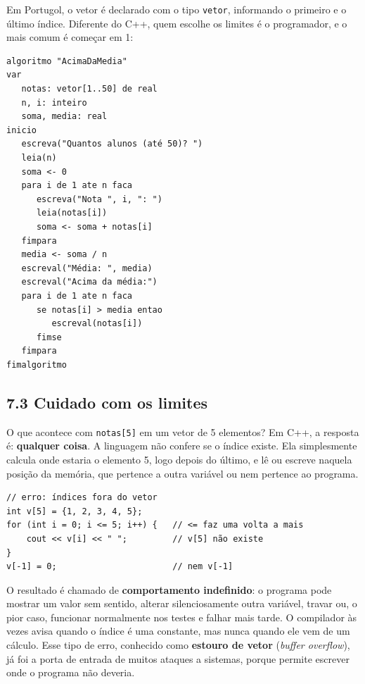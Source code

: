 Em Portugol, o vetor é declarado com o tipo \texttt{vetor}, informando o primeiro e o último índice. Diferente do C++, quem escolhe os limites é o programador, e o mais comum é começar em 1:

\begin{codigo}
\begin{Verbatim}[breaklines=true, breaksymbolleft={}, fontsize=\footnotesize]
algoritmo "AcimaDaMedia"
var
   notas: vetor[1..50] de real
   n, i: inteiro
   soma, media: real
inicio
   escreva("Quantos alunos (até 50)? ")
   leia(n)
   soma <- 0
   para i de 1 ate n faca
      escreva("Nota ", i, ": ")
      leia(notas[i])
      soma <- soma + notas[i]
   fimpara
   media <- soma / n
   escreval("Média: ", media)
   escreval("Acima da média:")
   para i de 1 ate n faca
      se notas[i] > media entao
         escreval(notas[i])
      fimse
   fimpara
fimalgoritmo
\end{Verbatim}
\end{codigo}

\subsection{7.3 Cuidado com os limites}

O que acontece com \texttt{notas[5]} em um vetor de 5 elementos? Em C++, a resposta é: \textbf{qualquer coisa}. A linguagem não confere se o índice existe. Ela simplesmente calcula onde estaria o elemento 5, logo depois do último, e lê ou escreve naquela posição da memória, que pertence a outra variável ou nem pertence ao programa.

\begin{codigo}
\begin{Verbatim}[breaklines=true, breaksymbolleft={}, fontsize=\footnotesize]
// erro: índices fora do vetor
int v[5] = {1, 2, 3, 4, 5};
for (int i = 0; i <= 5; i++) {   // <= faz uma volta a mais
    cout << v[i] << " ";         // v[5] não existe
}
v[-1] = 0;                       // nem v[-1]
\end{Verbatim}
\end{codigo}

O resultado é chamado de \textbf{comportamento indefinido}: o programa pode mostrar um valor sem sentido, alterar silenciosamente outra variável, travar ou, o pior caso, funcionar normalmente nos testes e falhar mais tarde. O compilador às vezes avisa quando o índice é uma constante, mas nunca quando ele vem de um cálculo. Esse tipo de erro, conhecido como \textbf{estouro de vetor} (\textit{buffer overflow}), já foi a porta de entrada de muitos ataques a sistemas, porque permite escrever onde o programa não deveria.

